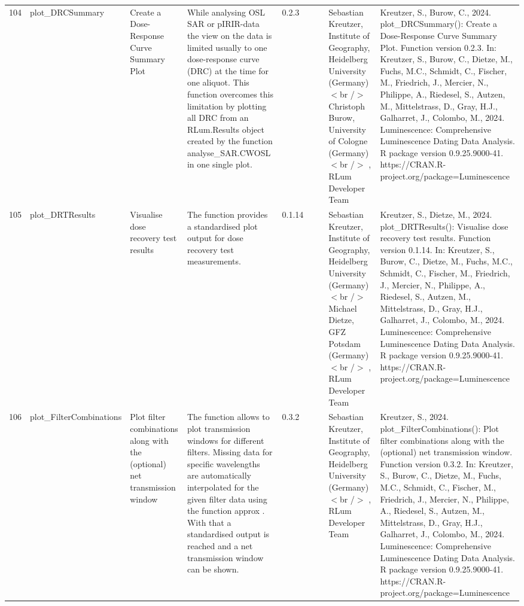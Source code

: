 \begin{table}[ht]
\begin{tabular}{rllllllll}
 \\ 
  104 & plot\_DRCSummary & Create a Dose-Response Curve Summary Plot & While analysing OSL SAR or pIRIR-data the view on the data is limited usually to one dose-response curve (DRC) at the time for one aliquot. This function overcomes this limitation by plotting all DRC from an  RLum.Results  object created by the function  analyse\_SAR.CWOSL  in one single plot. & 0.2.3
 &  &  & Sebastian Kreutzer, Institute of Geography, Heidelberg University (Germany)  $<$br /$>$ Christoph Burow, University of Cologne (Germany)$<$br /$>$ , RLum Developer Team & Kreutzer, S., Burow, C., 2024. plot\_DRCSummary(): Create a Dose-Response Curve Summary Plot. Function version 0.2.3. In: Kreutzer, S., Burow, C., Dietze, M., Fuchs, M.C., Schmidt, C., Fischer, M., Friedrich, J., Mercier, N., Philippe, A., Riedesel, S., Autzen, M., Mittelstrass, D., Gray, H.J., Galharret, J., Colombo, M., 2024. Luminescence: Comprehensive Luminescence Dating Data Analysis. R package version 0.9.25.9000-41. https://CRAN.R-project.org/package=Luminescence
 \\ 
  105 & plot\_DRTResults & Visualise dose recovery test results & The function provides a standardised plot output for dose recovery test measurements. & 0.1.14
 &  &  & Sebastian Kreutzer, Institute of Geography, Heidelberg University (Germany) $<$br /$>$ Michael Dietze, GFZ Potsdam (Germany)$<$br /$>$ , RLum Developer Team & Kreutzer, S., Dietze, M., 2024. plot\_DRTResults(): Visualise dose recovery test results. Function version 0.1.14. In: Kreutzer, S., Burow, C., Dietze, M., Fuchs, M.C., Schmidt, C., Fischer, M., Friedrich, J., Mercier, N., Philippe, A., Riedesel, S., Autzen, M., Mittelstrass, D., Gray, H.J., Galharret, J., Colombo, M., 2024. Luminescence: Comprehensive Luminescence Dating Data Analysis. R package version 0.9.25.9000-41. https://CRAN.R-project.org/package=Luminescence
 \\ 
  106 & plot\_FilterCombinations & Plot filter combinations along with the (optional) net transmission window & The function allows to plot transmission windows for different filters. Missing data for specific wavelengths are automatically interpolated for the given filter data using the function  approx . With that a standardised output is reached and a net transmission window can be shown. & 0.3.2
 &  &  & Sebastian Kreutzer, Institute of Geography, Heidelberg University (Germany)$<$br /$>$ , RLum Developer Team & Kreutzer, S., 2024. plot\_FilterCombinations(): Plot filter combinations along with the (optional) net transmission window. Function version 0.3.2. In: Kreutzer, S., Burow, C., Dietze, M., Fuchs, M.C., Schmidt, C., Fischer, M., Friedrich, J., Mercier, N., Philippe, A., Riedesel, S., Autzen, M., Mittelstrass, D., Gray, H.J., Galharret, J., Colombo, M., 2024. Luminescence: Comprehensive Luminescence Dating Data Analysis. R package version 0.9.25.9000-41. https://CRAN.R-project.org/package=Luminescence

\end{tabular}
\end{table}
